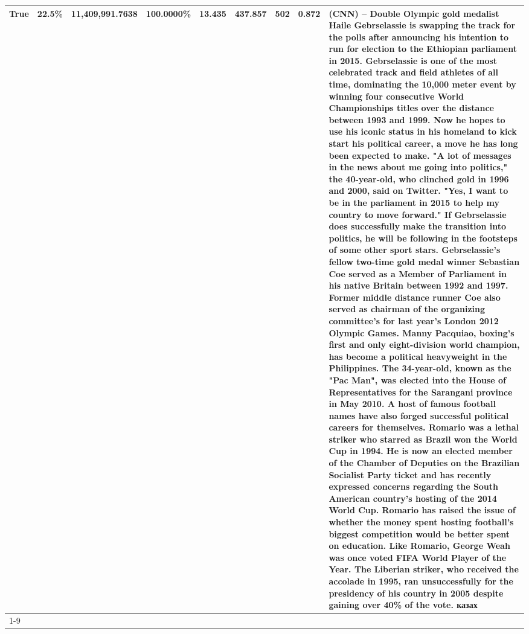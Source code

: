 \begin{table}[H]
{\begin{tabular}{lllrlllll}
True & 22.5\% & 11,409,991.7638 & \bfseries \color{red} 100.0000\% & 13.435 & 437.857 & 502 & 0.872 & (CNN) -- Double Olympic gold medalist Haile Gebrselassie is swapping the track for the polls after announcing his intention to run for election to the Ethiopian parliament in 2015. Gebrselassie is one of the most celebrated track and field athletes of all time, dominating the 10,000 meter event by winning four consecutive World Championships titles over the distance between 1993 and 1999. Now he hopes to use his iconic status in his homeland to kick start his political career, a move he has long been expected to make. "A lot of messages in the news about me going into politics," the 40-year-old, who clinched gold in 1996 and 2000, said on Twitter. "Yes, I want to be in the parliament in 2015 to help my country to move forward." If Gebrselassie does successfully make the transition into politics, he will be following in the footsteps of some other sport stars. Gebrselassie's fellow two-time gold medal winner Sebastian Coe served as a Member of Parliament in his native Britain between 1992 and 1997. Former middle distance runner Coe also served as chairman of the organizing committee's for last year's London 2012 Olympic Games. Manny Pacquiao, boxing's first and only eight-division world champion, has become a political heavyweight in the Philippines. The 34-year-old, known as the "Pac Man", was elected into the House of Representatives for the Sarangani province in May 2010. A host of famous football names have also forged successful political careers for themselves. Romario was a lethal striker who starred as Brazil won the World Cup in 1994. He is now an elected member of the Chamber of Deputies on the Brazilian Socialist Party ticket and has recently expressed concerns regarding the South American country's hosting of the 2014 World Cup. Romario has raised the issue of whether the money spent hosting football's biggest competition would be better spent on education. Like Romario, George Weah was once voted FIFA World Player of the Year. The Liberian striker, who received the accolade in 1995, ran unsuccessfully for the presidency of his country in 2005 despite gaining over 40\% of the vote. казах \\
\cline{1-9}

\end{tabular}}
\end{table}
